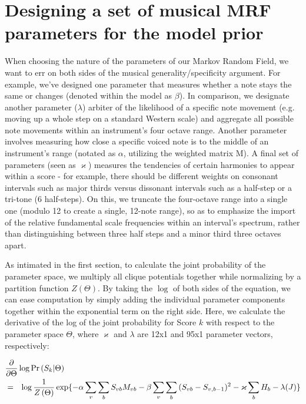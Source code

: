 \documentclass{article}
\begin{document}
\section{Designing a set of musical MRF parameters for the model prior}

When choosing the nature of the parameters of our Markov Random Field, we want to err on both sides of the musical generality/specificity argument.  For example, we've designed one parameter that measures whether a note stays the same or changes (denoted within the model as $\beta$).  In comparison, we designate another parameter ($\lambda$) arbiter of the likelihood of a specific note movement (e.g. moving up a whole step on a standard Western scale) and aggregate all possible note movements within an instrument's four octave range.  Another parameter involves measuring how close a specific voiced note is to the middle of an instrument's range (notated as $\alpha$, utilizing the weighted matrix M).  A final set of parameters (seen as $\varkappa$) measures the tendencies of certain harmonies to appear within a score - for example, there should be different weights on consonant intervals such as major thirds versus dissonant intervals such as a half-step or a tri-tone (6 half-steps).  On this, we truncate the four-octave range into a single one (modulo 12 to create a single, 12-note range), so as to emphasize the import of the relative fundamental scale frequencies within an interval's spectrum, rather than distinguishing between three half steps and a minor third three octaves apart.

As intimated in the first section, to calculate the joint probability of the parameter space, we multiply all clique potentials together while normalizing by a partition function $Z\left(\Theta\right)$.  By taking the $\log$ of both sides of the equation, we can ease computation by simply adding the individual parameter components together within the exponential term on the right side.  Here, we calculate the derivative of the log of the joint probability for Score $k$ with respect to the parameter space $\Theta$, where $\varkappa$ and $\lambda$ are 12x1 and 95x1 parameter vectors, respectively:

\begin{eqnarray*}
\lefteqn{\frac{\partial}{\partial\Theta}\log{\Pr\left(S_k|\Theta\right)}}  \\
&=& \log{\frac{1}{Z\left(\Theta\right)}\exp\{-\alpha\sum_v\sum_b{S_{vb}M_{vb}}- \beta\sum_v\sum_b{(S_{vb}-S_{v,b-1})^2} - \varkappa\sum_{b}{H_b} - \lambda({J})\}}
\end{eqnarray*}
\end{document}
